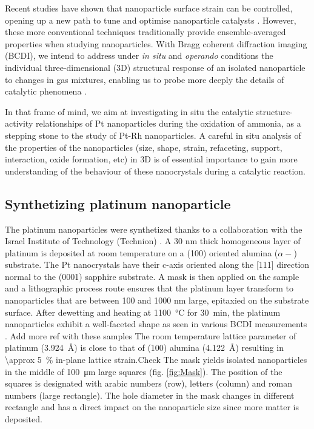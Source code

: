 Recent studies have shown that nanoparticle surface strain can be controlled, opening up a new path to tune and optimise nanoparticle catalysts \parencite{Zhang2014, Sneed2015, Wang2016}.
However, these more conventional techniques traditionally provide ensemble-averaged properties when studying nanoparticles.
With Bragg coherent diffraction imaging (BCDI), we intend to address under \textit{in situ} and \textit{operando} conditions the individual three-dimensional (3D) structural response of an isolated nanoparticle to changes in gas mixtures, enabling us to probe more deeply the details of catalytic phenomena \parencite{Fernandez2019, Passos2020, Dupraz2022}.

In that frame of mind, we aim at investigating in situ the catalytic structure-activity relationships of Pt nanoparticles during the oxidation of ammonia, as a stepping stone to the study of Pt-Rh nanoparticles.
A careful in situ analysis of the properties of the nanoparticles (size, shape, strain, refaceting, support, interaction, oxide formation, etc) in 3D is of essential importance to gain more understanding of the behaviour of these nanocrystals during a catalytic reaction.

\subsection{Synthetizing platinum nanoparticle}\label{sec:PtParticles}

The platinum nanoparticles were synthetized thanks to a collaboration with the Israel Institute of Technology (Technion) \parencite{Dupraz2017}.
A 30 nm thick homogeneous layer of platinum is deposited at room temperature on a (100) oriented alumina ($\alpha-$) substrate.
The Pt nanocrystals have their c-axis oriented along the [111] direction normal to the (0001) sapphire substrate.
A mask is then applied on the sample and a lithographic process route ensures that the platinum layer transform to nanoparticles that are between 100 and 1000 nm large,  epitaxied on the substrate surface.
After dewetting and heating at \qty{1100}{\degreeCelsius} for \qty{30}{\minute}, the platinum nanoparticles exhibit a well-faceted shape as seen in various BCDI measurements \parencite{Dupraz2017}.
\textcolor{Important}{Add more ref with these samples}
The room temperature lattice parameter of platinum (\qty{3.924}{\angstrom}) is close to that of (100) alumina (\qty{4.122}{\angstrom}) resulting in \qty{\approx 5}{\percent} in-plane lattice strain.\textcolor{Important}{Check}
The mask yields isolated nanoparticles in the middle of \qty{100}{\um} large squares (fig. \ref{fig:Mask}).
The position of the squares is designated with arabic numbers (row), letters (column) and roman numbers (large rectangle).
The hole diameter in the mask changes in different rectangle and has a direct impact on the nanoparticle size since more matter is deposited.

